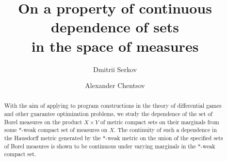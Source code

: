 
\begin{englishtitle} %
\title{On a property of continuous dependence of sets\\ in the space of measures}
\author{Dmitrii Serkov\inst{}
  \and
  Alexander Chentsov\inst{}
}

\maketitle

\begin{abstract}
With the aim of applying to program constructions in the theory of differential games and other guarantee optimization problems, we study the dependence of the set of Borel measures on the product $X\times Y$ of metric compact sets on their marginals from some $*$-weak compact set of measures on $X$.
The continuity of such a dependence in the Hausdorff metric generated by the $*$-weak metric on the union of the specified sets of Borel measures is shown to be continuous under varying marginals in the $*$-weak compact set.
\end{abstract}
\end{englishtitle}

\iffalse

%
%

